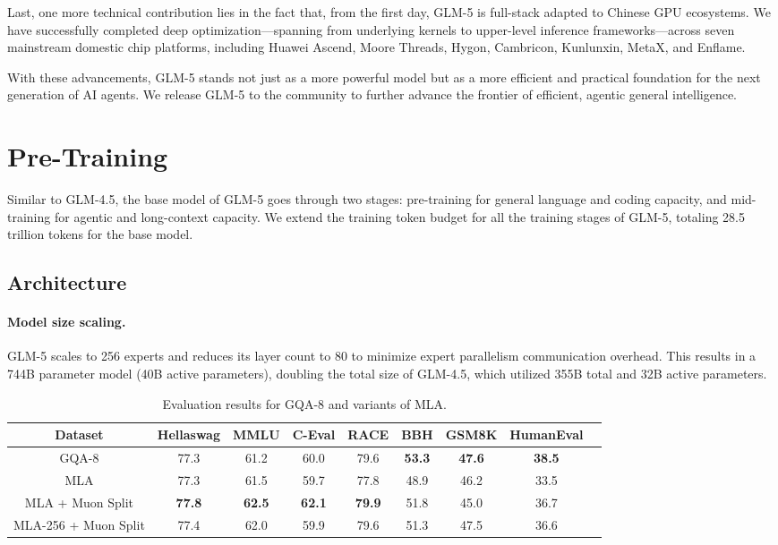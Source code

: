 \documentclass{article}
\theoremstyle{definition}
\begin{document}
Last, one more technical contribution lies in the fact that, from the first day, GLM-5 is full-stack adapted to Chinese GPU ecosystems. We have successfully completed deep optimization—spanning from underlying kernels to upper-level inference frameworks—across seven mainstream domestic chip platforms, including Huawei Ascend, Moore Threads, Hygon, Cambricon, Kunlunxin, MetaX, and Enflame.

With these advancements, GLM-5 stands not just as a more powerful model but as a more efficient and practical foundation for the next generation of AI agents. We release GLM-5 to the community to further advance the frontier of efficient, agentic general intelligence.

\section{Pre-Training}
Similar to GLM-4.5, the base model of GLM-5 goes through two stages: pre-training for general language and coding capacity, and mid-training for agentic and long-context capacity. We extend the training token budget for all the training stages of GLM-5, totaling 28.5 trillion tokens for the base model.

\subsection{Architecture}

\paragraph{Model size scaling.} GLM-5 scales to 256 experts and reduces its layer count to 80 to minimize expert parallelism communication overhead. This results in a 744B parameter model (40B active parameters), doubling the total size of GLM-4.5, which utilized 355B total and 32B active parameters.

\begin{table}[!ht]
    \small
    \centering
    \caption{Evaluation results for GQA-8 and variants of MLA.}
    \begin{tabular}{c|cccccccc}
        \toprule
        Dataset & Hellaswag & MMLU & C-Eval & RACE & BBH & GSM8K & HumanEval \\
        \midrule
        GQA-8 & 77.3 & 61.2 & 60.0 & 79.6 & \textbf{53.3} & \textbf{47.6} & \textbf{38.5} \\
        MLA & 77.3 & 61.5 & 59.7 & 77.8 & 48.9 & 46.2 & 33.5 \\
        MLA + Muon Split & \textbf{77.8} & \textbf{62.5} & \textbf{62.1} & \textbf{79.9} & 51.8 & 45.0 & 36.7\\
        MLA-256 + Muon Split & 77.4 & 62.0 & 59.9 & 79.6 & 51.3 & 47.5 & 36.6 \\
        \bottomrule
    \end{tabular}
    \label{tab:mla}
\end{table}
\end{document}
